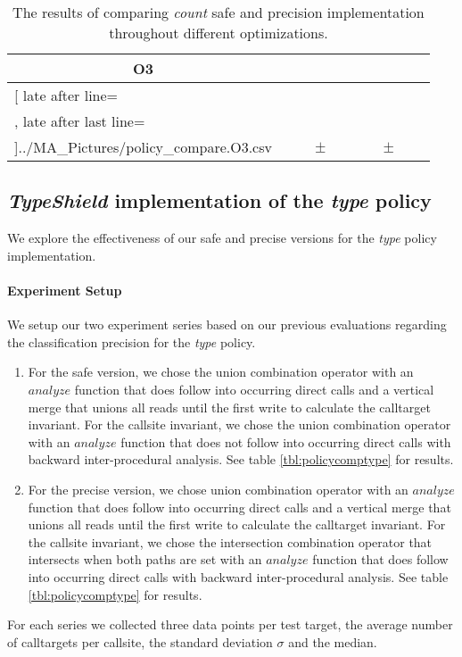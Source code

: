 \begin{table}[!htbp]
{\begin{tabular}{l|c|rcl|c|rcl|c}
\multicolumn{1}{c}{\bfseries O3}
	\\\midrule
	\csvreader[ late after line=\\, late after last line=\\\bottomrule]{../MA_Pictures/policy_compare.O3.csv}{
}
	{\csvcolii  &  \csvcoliii & \csvcoliv & $\pm$ & \csvcolv & \csvcolvi & \csvcolvii & $\pm$ & \csvcolviii& \csvcolix}%

    	\end{tabular}
}
		\caption {The results of comparing \textit{count} safe and precision implementation throughout different optimizations.}
		\label{tbl:policycompcount}
\end{table}

\newpage

\subsection{\textit{TypeShield} implementation of the \textit{type} policy}
\label{subsection:typeshieldvslimitcount}
We explore the effectiveness of our safe and precise versions for the \textit{type} policy implementation.

\paragraph{Experiment Setup} We setup our two experiment series based on our previous evaluations regarding the classification precision for the \textit{type} policy.
\begin{enumerate}
\item For the safe version, we chose the union combination operator with an $analyze$ function that does follow into occurring direct calls  and a vertical merge that unions all reads until the first write to calculate the calltarget invariant. For the callsite invariant, we chose the union combination operator with an $analyze$ function that does not follow into occurring direct calls  with backward inter-procedural analysis.  See table \ref{tbl:policycomptype} for results. 
\item For the precise version, we chose union combination operator with an $analyze$ function that does follow into occurring direct calls  and a vertical merge that unions all reads until the first write to calculate the calltarget invariant. For the callsite invariant, we chose the intersection combination operator that intersects when both paths are set with an $analyze$ function that does follow into occurring direct calls with backward inter-procedural analysis. See table \ref{tbl:policycomptype} for results. 
\end{enumerate}
For each series we collected three data points per test target, the average number of calltargets per callsite, the standard deviation $\sigma$ and the median.

